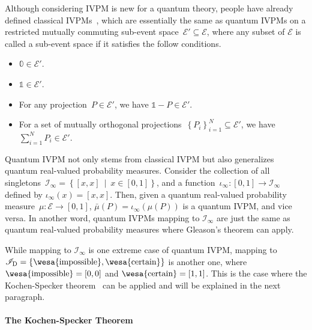\documentclass[english,reprint, aps, prl,superscriptaddress, showpacs,
showkeys, longbibliography, amsmath, amssymb]{revtex4-1}
\theoremstyle{plain}
\theoremstyle{definition}
\newcommand{\events}{\ensuremath{\mathcal{E}}}
\newcommand{\imposs}{{\text{\wesa{impossible}}}}
\newcommand{\necess}{{\text{\wesa{certain}}}}
\newcommand{\set}[2]{\ensuremath{\left\{ {#1}~\middle|~{#2}\right\} }}
\begin{document}
Although considering IVPM is new for a quantum theory, people have
already defined classical IVPMs~\cite{JamisonLodwick2004}, which
are essentially the same as quantum IVPMs on a restricted mutually
commuting sub-event space~$\events'\subseteq\events$, where any
subset of $\events$ is called a sub-event space if it satisfies the
follow conditions. 
\begin{itemize}
\item $\mathbb{0}\in\events'$. 
\item $\mathbb{1}\in\events'$. 
\item For any projection~$P\in\events'$, we have $\mathbb{1}-P\in\events'$. 
\item For a set of mutually orthogonal projections~$\left\{ P_{i}\right\} _{i=1}^{N}\subseteq\events'$,
we have $\sum_{i=1}^{N}P_{i}\in\events'$. 
\end{itemize}
Quantum IVPM not only stems from classical IVPM but also generalizes
quantum real-valued probability measures. Consider the collection
of all singletons~$\mathscr{I}_{\infty}=\set{\left[x,x\right]}{x\in\left[0,1\right]}$,
and a function~$\iota_{\infty}:\left[0,1\right]\rightarrow\mathscr{I}_{\infty}$
defined by $\iota_{\infty}\left(x\right)=\left[x,x\right]$. Then,
given a quantum real-valued probability measure~$\mu:\events\rightarrow\left[0,1\right]$,
$\bar{\mu}(P)=\iota_{\infty}\left(\mu(P)\right)$ is a quantum IVPM,
and vice versa. In another word, quantum IVPMs mapping to $\mathscr{I}_{\infty}$
are just the same as quantum real-valued probability measures where
Gleason's theorem can apply.

While mapping to $\mathscr{I}_{\infty}$ is one extreme case of quantum
IVPM, mapping to $\mathscr{I}_{\mathrm{D}}=\left\{ \imposs,\necess\right\} $
is another one, where $\imposs=\left[0,0\right]$ and $\necess=\left[1,1\right]$.
This is the case where the Kochen-Specker theorem~\cite{kochenspecker1967,peres1995quantum,Redhead1987-REDINA}
can be applied and will be explained in the next paragraph.

\paragraph{The Kochen-Specker Theorem}
\end{document}
